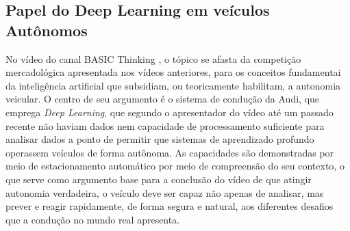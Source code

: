 \subsection{Papel do Deep Learning em veículos Autônomos}

No vídeo do canal BASIC Thinking \parencite{basicthinking}, o tópico se afasta da competição mercadológica apresentada nos vídeos anteriores, para os conceitos fundamentai da inteligência artificial que subsidiam, ou teoricamente habilitam, a autonomia veicular. O centro de seu argumento é o sistema de condução da Audi, que emprega \textit{Deep Learning}, que segundo o apresentador do vídeo até um passado recente não haviam dados nem capacidade de processamento suficiente para analisar dados a ponto de permitir que sistemas de aprendizado profundo operassem veículos de forma autônoma. As capacidades são demonstradas por meio de estacionamento automático por meio de compreensão do seu contexto, o que serve como argumento base para a conclusão do vídeo de que atingir autonomia verdadeira, o veículo deve ser capaz não apenas de analisar, mas prever e reagir rapidamente, de forma segura e natural, aos diferentes desafios que a condução no mundo real apresenta.
